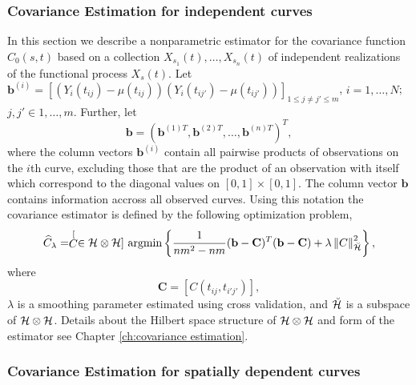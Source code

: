 \subsubsection{Covariance Estimation for independent curves} %
\label{sub:subsection_name}

In this section we describe a nonparametric estimator for the covariance function $C_0(s,t)$ based on a collection $X_{s_1}(t), \dots, X_{s_n}(t)$ of independent realizations of the functional process $X_s(t)$. Let $\mathbf{b}^{(i)} = [(Y_i(t_{ij})-\mu(t_{ij}))(Y_i(t_{ij'})-\mu(t_{ij'}))]_{1\leq j\neq j'\leq m}$, $i=1, \dots, N$; $j,j' \in 1, \dots, m$. Further, let
\begin{equation}
	\mathbf{b} = (\mathbf{b}^{(1)T}, \mathbf{b}^{(2)T}, \dots, \mathbf{b}^{(n)T} )^T, \label{b}
\end{equation} 
where the column vectors $\mathbf{b}^{(i)}$ contain all pairwise products of observations on the $i$th curve, excluding those that are the product of an observation with itself which correspond to the diagonal values on $[0,1]\times [0,1]$. The column vector $\mathbf{b}$ contains information accross all observed curves. Using this notation the covariance estimator is defined by the following optimization problem,
\begin{equation}
	 \widehat{C}_{\lambda}=\stackrel[C \in \mathcal{H}\otimes \mathcal{H}]{}{\text{ argmin}} \left\{\frac{1}{nm^2-nm} (\mathbf{b} - \mathbf{C})^T(\mathbf{b} - \mathbf{C})+\lambda\left\Vert C\right\Vert _{\breve{\mathcal{H}}}^{2} \right\},
	 \label{kriging: cov est}
	 \end{equation}
where
\[ \mathbf{C} = [C(t_{ij}, t_{i'j'})], \]
 $\lambda$ is a smoothing parameter estimated using cross validation, and $\breve{\mathcal{H}}$ is a subspace of $\mathcal{H}\otimes\mathcal{H}$. Details about the Hilbert space structure of $\mathcal{H}\otimes\mathcal{H}$ and form of the estimator see Chapter \ref{ch:covariance estimation}. 

\subsubsection{Covariance Estimation for spatially dependent curves} %
\label{sub:weighted covariance}

